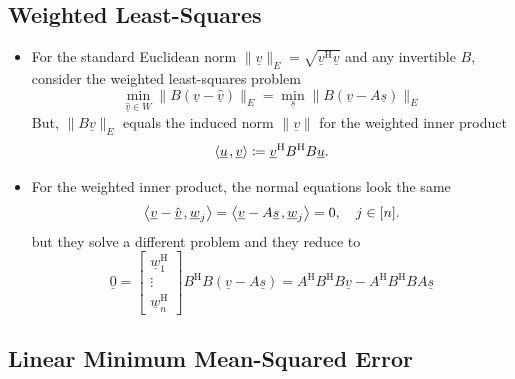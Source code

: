 \documentclass[11pt,twoside]{report}
\newcommand{\vecnot}{\underline}
\newcommand{\Herm}{{\mathrm{H}}}
\newcommand{\inner}[2]{{\left\langle #1 \mskip2mu , #2 \right\rangle}}
\begin{document}
\begin{itemize}
\begin{itemize}
\end{itemize} 
\end{itemize}

\subsection{Weighted Least-Squares} 

\begin{itemize}

\item 
For the standard Euclidean norm $\| \vecnot{v} \|_E = \sqrt{\vecnot{v}^\Herm \vecnot{v}}$ and any invertible $B$, consider the weighted least-squares problem
\[ \min_{\hat{\vecnot{v}}\in W} \| B(\vecnot{v} - \hat{ \vecnot{v}}) \|_E = \min_{\vecnot{s}} \| B( \vecnot{v} - A \vecnot{s}) \|_E \]
But, $\| B \vecnot{v} \|_E$ equals the induced norm $\| \vecnot{v} \|$ for the weighted inner product
\[ \inner{ \vecnot{u} }{ \vecnot{v} }  \coloneqq \vecnot{v}^\Herm B^\Herm B \vecnot{u}. \]

\item 
For the weighted inner product, the normal equations look the same
\[ \inner{ \vecnot{v} - \hat{\vecnot{v}} }{ \vecnot{w}_j }
= \inner{ \vecnot{v} - A \vecnot{s} }{ \vecnot{w}_j }
= 0, \quad j \in [n]. \]
but they solve a different problem and they reduce to
\begin{equation*}
\vecnot{0} = \left[ \begin{array}{c} \vecnot{w}_1^\Herm \\ \vdots \\ \vecnot{w}_n^\Herm \end{array} \right] B^\Herm B \left( \vecnot{v} - A \vecnot{s} \right) = A^\Herm B^\Herm B \vecnot{v} - A^\Herm B^\Herm B A \vecnot{s}
\end{equation*}
\end{itemize}

\subsection{Linear Minimum Mean-Squared Error} 
\end{document}

